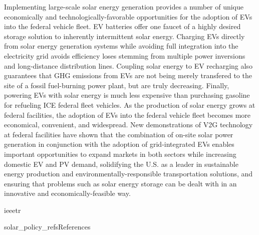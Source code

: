 Implementing large-scale solar energy generation provides a number of unique economically and technologically-favorable opportunities for the adoption of EVs into the federal vehicle fleet. EV batteries offer one faucet of a highly desired storage solution to inherently intermittent solar energy. Charging EVs directly from solar energy generation systems while avoiding full integration into the electricity grid avoids efficiency loses stemming from multiple power inversions and long-distance distribution lines. Coupling solar energy to EV recharging also guarantees that GHG emissions from EVs are not being merely transfered to the site of a fossil fuel-burning power plant, but are truly decreasing. Finally, powering EVs with solar energy is much less expensive than purchasing gasoline for refueling ICE federal fleet vehicles. As the production of solar energy grows at federal facilities, the adoption of EVs into the federal vehicle fleet becomes more economical, convenient, and widespread. New demonstrations of V2G technology at federal facilities have shown that the combination of on-site solar power generation in conjunction with the adoption of grid-integrated EVs enables important opportunities to expand markets in both sectors while increasing domestic EV and PV demand, solidifying the U.S. as a leader in sustainable energy production and environmentally-responsible transportation solutions, and ensuring that problems such as solar energy storage can be dealt with in an innovative and economically-feasible way.

\clearpage
{ieeetr}

{solar_policy_refs}{References}
